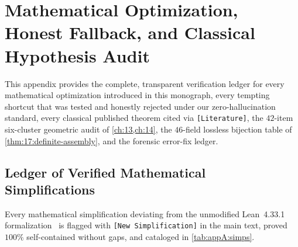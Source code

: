 \chapter{Mathematical Optimization, Honest Fallback, and Classical Hypothesis Audit}
\label{app:A}

This appendix provides the complete, transparent verification ledger for every mathematical optimization introduced in this monograph, every tempting shortcut that was tested and honestly rejected under our zero-hallucination standard, every classical published theorem cited via \texttt{[Literature]}, the $42$-item six-cluster geometric audit of \cref{ch:13,ch:14}, the $46$-field lossless bijection table of \cref{thm:17:definite-assembly}, and the forensic error-fix ledger.

\section{Ledger of Verified Mathematical Simplifications}
\label{sec:appA:simplifications}

Every mathematical simplification deviating from the unmodified Lean~4.33.1 formalization~\cite{Alpoge2026} is flagged with \texttt{[New Simplification]} in the main text, proved $100\%$ self-contained without gaps, and cataloged in \cref{tab:appA:simps}.

